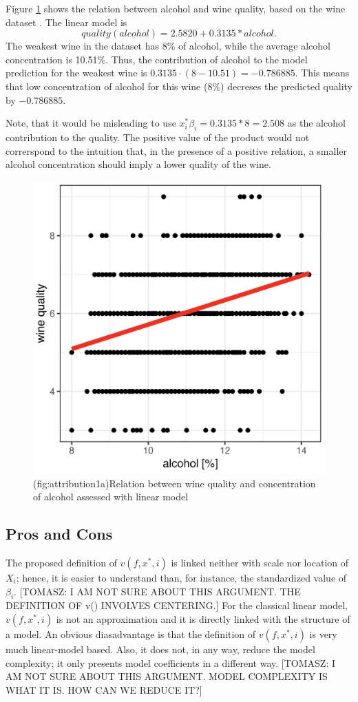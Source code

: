 \documentclass[12pt,]{krantz}
\theoremstyle{definition}
\theoremstyle{definition}
\theoremstyle{definition}
\theoremstyle{remark}
\begin{document}
Figure \ref{fig:attribution1a} shows the relation between alcohol and
wine quality, based on the wine dataset \citep{wine2009}. The linear
model is \[
quality(alcohol) = 2.5820 + 0.3135 * alcohol.
\] The weakest wine in the dataset has 8\% of alcohol, while the average
alcohol concentration is 10.51\%. Thus, the contribution of alcohol to
the model prediction for the weakest wine is
\(0.3135 \cdot (8-10.51) = -0.786885\). This means that low
concentration of alcohol for this wine (8\%) decreses the predicted
quality by \(-0.786885\).

Note, that it would be misleading to use
\(x_i^*\beta_i = 0.3135*8 = 2.508\) as the alcohol contribution to the
quality. The positive value of the product would not correrspond to the
intuition that, in the presence of a positive relation, a smaller
alcohol concentration should imply a lower quality of the wine.

\begin{figure}

{\centering \includegraphics[width=0.5\linewidth]{figure/attribution_1} 

}

\caption{(fig:attribution1a)Relation between wine quality and concentration of alcohol assessed with linear model}\label{fig:attribution1a}
\end{figure}

\hypertarget{pros-and-cons-4}{%
\subsection{Pros and Cons}\label{pros-and-cons-4}}

The proposed definition of \(v(f, x^*, i)\) is linked neither with scale
nor location of \(X_i\); hence, it is easier to understand than, for
instance, the standardized value of \(\beta_i\). {[}TOMASZ: I AM NOT
SURE ABOUT THIS ARGUMENT. THE DEFINITION OF v() INVOLVES CENTERING.{]}
For the classical linear model, \(v(f, x^*, i)\) is not an approximation
and it is directly linked with the structure of a model. An obvious
diasadvantage is that the definition of \(v(f, x^*, i)\) is very much
linear-model based. Also, it does not, in any way, reduce the model
complexity; it only presents model coefficients in a different way.
{[}TOMASZ: I AM NOT SURE ABOUT THIS ARGUMENT. MODEL COMPLEXITY IS WHAT
IT IS. HOW CAN WE REDUCE IT?{]}
\end{document}
